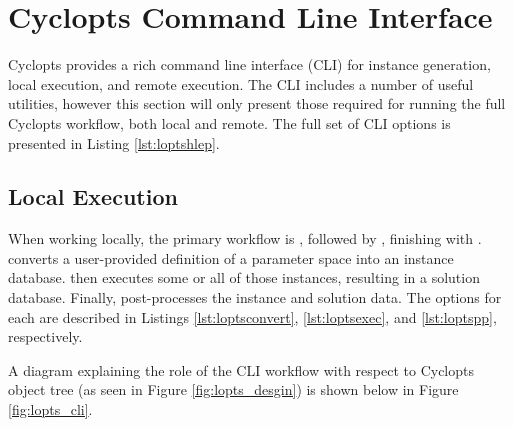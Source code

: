 
\chapter{Cyclopts Command Line Interface}\label{method:tools:cli}

Cyclopts provides a rich command line interface (CLI) for instance generation,
local execution, and remote execution. The CLI includes a number of useful
utilities, however this section will only present those required for running the
full Cyclopts workflow, both local and remote. The full set of CLI options is
presented in Listing \ref{lst:loptshlep}.



\section{Local Execution}

When working locally, the primary workflow is , followed
by , finishing with .  converts a user-provided definition of a parameter space into an
instance database.  then executes some or all of those
instances, resulting in a solution database. Finally, 
post-processes the instance and solution data. The options for each are
described in Listings \ref{lst:loptsconvert}, \ref{lst:loptsexec}, and
\ref{lst:loptspp}, respectively.







A diagram explaining the role of the CLI workflow with respect to Cyclopts
object tree (as seen in Figure \ref{fig:lopts_desgin}) is shown below in Figure
\ref{fig:lopts_cli}.

